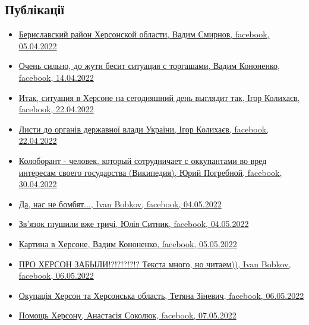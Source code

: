  
 
 
 
 
\subsection{Публікації}
\label{sec:topics.vojna.cities.herson.posts}

\begin{itemize} %

\item \hyperlink{05_04_2022.fb.smirnov_vadim.odessa.rieltor.1.berislav_rajon}{%
Бериславский район Херсонской области, Вадим Смирнов, facebook, 05.04.2022%
}

\item \hyperlink{14_04_2022.fb.kononenko_vadim.herson.1.torgashi}{%
Очень сильно, до жути бесит ситуация с торгашами, Вадим Кононенко, facebook, 14.04.2022%
}

\item \hyperlink{22_04_2022.fb.kolyhaev_igor.herson.mer.1.herson}{%
Итак, ситуация в Херсоне на сегодняшний день выглядит так, Ігор Колихаєв, facebook, 22.04.2022%
}

\item \hyperlink{26_04_2022.fb.kolyhaev_igor.herson.mer.1.lysty}{%
Листи до органів державної влади України, Ігор Колихаєв, facebook, 22.04.2022%
}

\item \hyperlink{30_04_2022.fb.pogrebnoj_jurij.herson.1.koloborant}{%
Колоборант - человек, который сотрудничает с оккупантами во вред интересам своего государства (Википедия), %
Юрий Погребной, facebook, 30.04.2022%
}

\item \hyperlink{04_05_2022.fb.bobkov_ivan.1.nas_ne_bombjat}{%
Да, нас не бомбят..., Ivan Bobkov, facebook, 04.05.2022%
}

\item \hyperlink{04_05_2022.fb.sytnik_julia.herson.1.zvjazok_glyshili_trychi}{%
Зв'язок глушили вже тричі, Юлія Ситник, facebook, 04.05.2022%
}

\item \hyperlink{05_05_2022.fb.kononenko_vadim.herson.1.kartina_v_hersone}{%
Картина в Херсоне, Вадим Кононенко, facebook, 05.05.2022%
}

\item \hyperlink{06_05_2022.fb.bobkov_ivan.1.pro_herson_zabyli}{%
ПРО ХЕРСОН ЗАБЫЛИ!?!?!?!?!?  Текста много, но читаем)), Ivan Bobkov, facebook, 06.05.2022%
}

\item \hyperlink{06_05_2022.fb.zinevich_tetjana.herson.1.okupacia}{%
Окупація Херсон та Херсонська область, Тетяна Зіневич, facebook, 06.05.2022%
}

\item \hyperlink{07_05_2022.fb.sokoljuk_anastasia.1.pomosch_hersonu}{%
Помощь Херсону, Анастасія Соколюк, facebook, 07.05.2022%
}

\end{itemize} %

